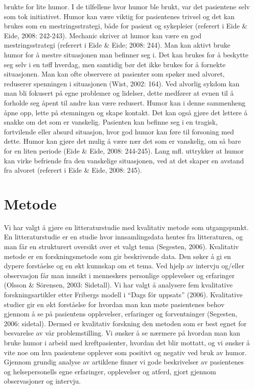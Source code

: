 brukte for lite humor. I de tilfellene hvor humor ble brukt, var det pasientene
selv som tok initiativet.  Humor kan være viktig for pasientenes trivsel og det
kan brukes som en mestringsstrategi, både for pasient og sykepleier (referert i
Eide \&{} Eide, 2008: 242-243).  Mechanic skriver at humor kan være en god
mestringsstrategi (referert i Eide \&{} Eide; 2008: 244). Man kan aktivt bruke
humor for å mestre situasjonen man befinner seg i. Det kan brukes for å
beskytte seg selv i en tøff hverdag, men samtidig bør det ikke brukes for å
fornekte situasjonen. Man kan ofte observere at pasienter som spøker med
alvoret, reduserer spenningen i situasjonen (Wist, 2002: 164).  Ved alvorlig
sykdom kan man bli fokusert på egne problemer og lidelser, dette medfører at
evnen til å forholde seg åpent til andre kan være redusert. Humor kan i denne
sammenheng åpne opp, lette på stemningen og skape kontakt. Det kan også gjøre
det lettere å snakke om det som er vanskelig. Pasienten kan befinne seg i en
tragisk, fortvilende eller absurd situasjon, hvor god humor kan føre til
forsoning med dette. Humor kan gjøre det mulig å være nær det som er vanskelig,
om så bare for en liten periode (Eide \&{} Eide, 2008: 244-245). Lang mfl.
uttrykker at humor kan virke befriende fra den vanskelige situasjonen, ved at
det skaper en avstand fra alvoret (referert i Eide \&{} Eide, 2008: 245).

\chapter{Metode}

Vi har valgt å gjøre en litteraturstudie med kvalitativ metode som
utgangspunkt. En litteraturstudie er en studie hvor innsamlingsdata hentes fra
litteraturen, og man får en strukturert oversikt over et valgt tema (Segesten,
2006). Kvalitativ metode er en forskningsmetode som gir beskrivende data. Den
søker å gi en dypere forståelse og en økt kunnskap om et tema. Ved hjelp av
intervju og/eller observasjon får man innsikt i menneskers personlige
opplevelser og erfaringer (Olsson \&{} Sörensen, 2003: Sidetall). Vi har valgt å
analysere fem kvalitative forskningsartikler etter Fribergs modell i “Dags för
uppsats” (2006). Kvalitative studier gir en økt forståelse for hvordan man kan
møte pasientenes behov gjennom å se på pasientens opplevelser, erfaringer og
forventninger (Segesten, 2006: sidetal). Dermed er kvalitativ forskning den
metoden som er best egnet for besvarelse av vår problemstilling.  Vi ønsker å
se nærmere på hvordan man kan bruke humor i arbeid med kreftpasienter, hvordan
det blir mottatt, og vi ønsker å vite noe om hva pasientene opplever som
positivt og negativ ved bruk av humor. Gjennom grundig analyse av artiklene
finner vi gode beskrivelser av pasientenes og helsepersonells egne erfaringer,
opplevelser og atferd, gjort gjennom observasjoner og intervju.

